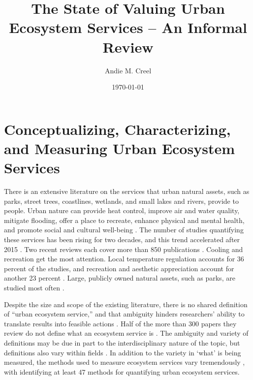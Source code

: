 \documentclass[12pt]{article}
\title{The State of Valuing Urban Ecosystem Services -- An Informal Review }
\author{Andie M. Creel}
\date{\today}
\begin{document}
\maketitle

\section{Conceptualizing, Characterizing, and Measuring Urban Ecosystem Services}\label{sec:intro}

There is an extensive literature on the services that urban natural assets, such as parks, street trees, coastlines, wetlands, and small lakes and rivers, provide to people. Urban nature can provide heat control, improve air and water quality, mitigate flooding, offer a place to recreate, enhance physical and mental health, and promote social and cultural well-being \citep{keelerSocialecologicalTechnologicalFactors2019, baro_mapping_2016}. The number of studies quantifying these services has been rising for two decades, and this trend accelerated after 2015 \citep{maReviewMethodsQuantifying2025}. Two recent reviews each cover more than 850 publications \citep{veerkampReviewStudiesAssessing2021, maReviewMethodsQuantifying2025}. Cooling and recreation get the most attention. Local temperature regulation accounts for 36 percent of the studies, and recreation and aesthetic appreciation account for another 23 percent \citep{veerkampReviewStudiesAssessing2021}. Large, publicly owned natural assets, such as parks, are studied most often \citep{veerkampReviewStudiesAssessing2021, maReviewMethodsQuantifying2025}.

Despite the size and scope of the existing literature, there is no shared definition of ``urban ecosystem service,'' and that ambiguity hinders researchers' ability to translate results into feasible actions \citep{tanConceptualFrameworkUntangle2020}. Half of the more than 300 papers they review do not define what an ecosystem service is \citep{tanConceptualFrameworkUntangle2020}. The ambiguity and variety of definitions may be due in part to the interdisciplinary nature of the topic, but definitions also vary within fields \citep{boydWhatAreEcosystem2007}.  In addition to the variety in `what' is being measured, the methods used to measure ecosystem services vary tremendously \citep{veerkampReviewStudiesAssessing2021}, with \citet{maReviewMethodsQuantifying2025} identifying at least 47 methods for quantifying urban ecosystem services.
\end{document}

